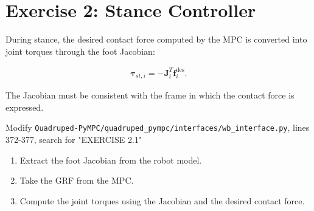 \documentclass[11pt,a4paper]{article}
\begin{document}
\section{Exercise 2: Stance Controller}

During stance, the desired contact force computed by the MPC is converted into joint torques through the foot Jacobian:

\begin{align*}
\bm{\tau}_{st,i} = -\bm{J}_i^T \bm{f}_i^{\mathrm{des}}.
\end{align*}

The Jacobian must be consistent with the frame in which the contact force is expressed.

Modify \verb|Quadruped-PyMPC/quadruped_pympc/interfaces/wb_interface.py|, lines 372-377, search for "EXERCISE 2.1"
\begin{enumerate}[label=\arabic*.]
    \item Extract the foot Jacobian from the robot model.
    \item Take the GRF from the MPC.
    \item Compute the joint torques using the Jacobian and the desired contact force.
\end{enumerate}

% 
% 
% 
% 
% 
% 
% 
% 
\end{document}
